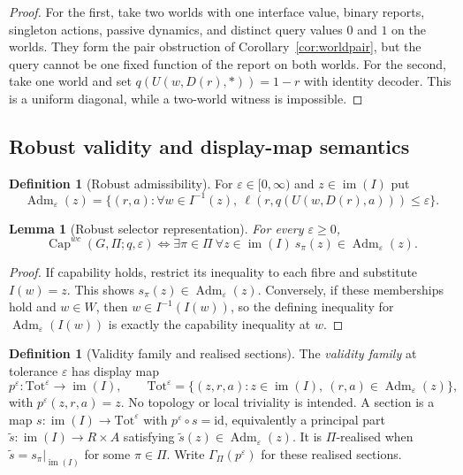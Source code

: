 \documentclass[11pt]{article}
\theoremstyle{plain}
\newtheorem{lemma}[theorem]{Lemma}
\theoremstyle{definition}
\newtheorem{definition}[theorem]{Definition}
\theoremstyle{remark}
\newcommand{\im}{\operatorname{im}}
\newcommand{\Capability}{\operatorname{Cap}}
\newcommand{\Adm}{\operatorname{Adm}}
\newcommand{\eps}{\varepsilon}
\begin{document}
\begin{proof}
For the first, take two worlds with one interface value, binary reports,
singleton actions, passive dynamics, and distinct query values $0$ and $1$ on
the worlds. They form the pair obstruction of
Corollary~\ref{cor:worldpair}, but the query cannot be one fixed function of the
report on both worlds. For the second, take one world and set
$q(U(w,D(r),\ast))=1-r$ with identity decoder. This is a uniform diagonal, while
a two-world witness is impossible.
\end{proof}


\subsection{Robust validity and display-map semantics}

\begin{definition}[Robust admissibility]\label{def:eps}
For $\eps\in[0,\infty)$ and $z\in\im(I)$ put
\[
\Adm_\eps(z)=\{(r,a):\forall w\in I^{-1}(z),
\ \ell(r,q(U(w,D(r),a)))\le\eps\}.
\]
\end{definition}

\begin{lemma}[Robust selector representation]\label{lem:robust-selector}
For every $\eps\ge0$,
\[
\Capability^{wc}(G,\Pi;q,\eps)
\iff
\exists\pi\in\Pi\ \forall z\in\im(I)\ s_\pi(z)\in\Adm_\eps(z).
\]
\end{lemma}

\begin{proof}
If capability holds, restrict its inequality to each fibre and substitute
$I(w)=z$. This shows $s_\pi(z)\in\Adm_\eps(z)$. Conversely, if these memberships
hold and $w\in W$, then $w\in I^{-1}(I(w))$, so the defining inequality for
$\Adm_\eps(I(w))$ is exactly the capability inequality at $w$.
\end{proof}

\begin{definition}[Validity family and realised sections]\label{def:bundle}
The \emph{validity family} at tolerance $\eps$ has display map
\[
p^\eps:\mathrm{Tot}^\eps\to\im(I),\qquad
\mathrm{Tot}^\eps=
\{(z,r,a):z\in\im(I),\ (r,a)\in\Adm_\eps(z)\},
\]
with $p^\eps(z,r,a)=z$. No topology or local triviality is intended. A section
is a map $s:\im(I)\to\mathrm{Tot}^\eps$ with
$p^\eps\circ s=\mathrm{id}$, equivalently a principal part
$\widetilde s:\im(I)\to R\times A$ satisfying
$\widetilde s(z)\in\Adm_\eps(z)$. It is $\Pi$-realised when
$\widetilde s=s_\pi|_{\im(I)}$ for some $\pi\in\Pi$. Write
$\Gamma_\Pi(p^\eps)$ for these realised sections.
\end{definition}
\end{document}
